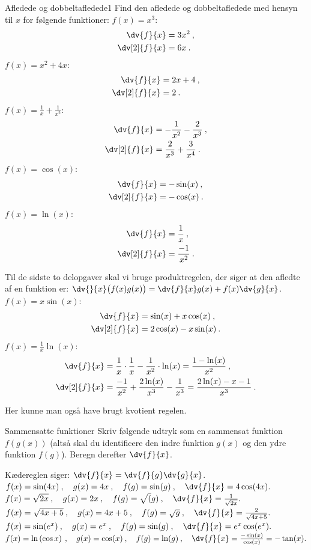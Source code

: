 \begin{opgave}{Afledede og dobbeltafledede}{1}
Find den afledede og dobbeltafledede med hensyn til $x$ for følgende funktioner:
\opg $f(x) = x^3$:
    \begin{align*}
        \dv{f}{x}&=3x^2 \: , \\
        \dv[2]{f}{x}&=6x \: .
    \end{align*}
\opg $f(x) = x^2 + 4x$:
    \begin{align*}
        \dv{f}{x}&=2x+4 \: ,\\
        \dv[2]{f}{x}&=2 \: .
    \end{align*}
\opg $f(x) = \frac{1}{x} + \frac{1}{x^2}$:
    \begin{align*}
        \dv{f}{x}&=-\frac{1}{x^2}-\frac{2}{x^3} \: , \\
        \dv[2]{f}{x}&=\frac{2}{x^3}+\frac{3}{x^4} \: .
    \end{align*}
\opg $f(x) = \cos(x)$:
    \begin{align*}
        \dv{f}{x}&=-\sin(x) \: , \\
        \dv[2]{f}{x}&= -\cos(x) \: .
    \end{align*}
\opg $f(x) = \ln(x)$:
    \begin{align*}
        \dv{f}{x}&=\frac{1}{x} \: , \\
        \dv[2]{f}{x}&=\frac{-1}{x^2} \: .
    \end{align*}

Til de sidste to delopgaver skal vi bruge produktregelen, der siger at den afledte af en funktion er: $\dv{}{x}\big(f(x)g(x)\big)=\dv{f}{x}g(x)+f(x)\dv{g}{x}$.
\opg $f(x) = x \sin(x)$:
    \begin{align*}
        \dv{f}{x}&=\sin(x)+x\cos(x) \: , \\
        \dv[2]{f}{x}&=2\cos(x)-x\sin(x) \: .
    \end{align*}
\opg $f(x) = \frac{1}{x} \ln(x)$:
    \begin{align*}
        \dv{f}{x}&=\frac{1}{x}\cdot \frac{1}{x}-\frac{1}{x^2}\cdot \ln(x)=\frac{1-\ln(x)}{x^2} \: , \\
        \dv[2]{f}{x}&=\frac{-1}{x^2}+\frac{2\ln(x)}{x^3}-\frac{1}{x^3}=\frac{2\ln(x)-x-1}{x^3} \: .
    \end{align*}

Her kunne man også have brugt kvotient regelen.
\end{opgave}
\begin{opgave}{Sammensatte funktioner}
Skriv følgende udtryk som en sammensat funktion $f(g(x))$ (altså skal du identificere den indre funktion $g(x)$ og den ydre funktion $f(g)$). Beregn derefter $\dv{f}{x}$.

Kædereglen siger: $\dv{f}{x}=\dv{f}{g}\dv{g}{x}$.
\opg $f(x) = \sin (4x)\:,~~~g(x)=4x\:,~~~f(g)=\sin(g)\:,~~~\dv{f}{x}=4\cos(4x).$
\opg $f(x) = \sqrt{2x}\:,~~~g(x)=2x\:,~~~f(g)=\sqrt(g)\:,~~~\dv{f}{x}=\frac{1}{\sqrt{2x}}.$
\opg $f(x) = \sqrt{4x+5}\:,~~~g(x)=4x+5\:,~~~f(g)=\sqrt{g}\:,~~~\dv{f}{x}=\frac{2}{\sqrt{4x+5}}.$
\opg $f(x) = \sin(e^x)\:,~~~g(x)=e^x\:,~~~f(g)=\sin(g)\:,~~~\dv{f}{x}=e^x\cos(e^x).$
\opg $f(x) =  \ln \left( \cos x \right)\:,~~~g(x)=\cos(x)\:,~~~f(g)=\ln(g)\:,~~~\dv{f}{x}=\frac{-\sin(x)}{\cos(x)}=-\tan(x).$
\end{opgave}

